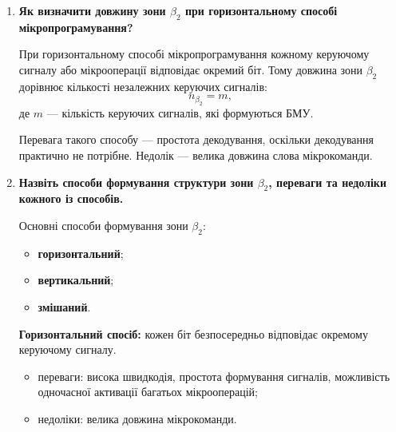 \documentclass[12pt,a4paper]{article}
\begin{document}
\begin{enumerate}
        Слово мікрокоманди зазвичай поділяється на кілька функціональних зон:
        \begin{itemize}
            \item \textbf{$\beta_1$} --- адресна зона; визначає спосіб переходу до наступної мікрокоманди, містить адресну інформацію або приріст адреси;
            \item \textbf{$\beta_2$} --- зона керуючих сигналів; задає мікрооперації, які необхідно виконати в поточній мікрокоманді;
            \item \textbf{$\beta_3$} --- зона часової організації; визначає тривалість мікрокоманди або затримку для виконання мікрооперацій;
            \item \textbf{$\beta_4$} --- додаткова або службова зона; використовується для формування спеціальних ознак, перевірок, режимів чи інших допоміжних функцій.
        \end{itemize}

        Загалом формат слова мікрокоманди можна подати як
        \[
            \text{МК} = \beta_1 \, \beta_2 \, \beta_3 \, \beta_4.
        \]

        \item \textbf{Як визначити довжину зони $\beta_2$ при горизонтальному способі мікропрограмування?}

        При горизонтальному способі мікропрограмування кожному керуючому сигналу або мікрооперації відповідає окремий біт. Тому довжина зони $\beta_2$ дорівнює кількості незалежних керуючих сигналів:
        \[
            n_{\beta_2} = m,
        \]
        де $m$ --- кількість керуючих сигналів, які формуються БМУ.

        Перевага такого способу --- простота декодування, оскільки декодування практично не потрібне. Недолік --- велика довжина слова мікрокоманди.

        \item \textbf{Назвіть способи формування структури зони $\beta_2$, переваги та недоліки кожного із способів.}

        Основні способи формування зони $\beta_2$:
        \begin{itemize}
            \item \textbf{горизонтальний};
            \item \textbf{вертикальний};
            \item \textbf{змішаний}.
        \end{itemize}

        \textbf{Горизонтальний спосіб:}
        кожен біт безпосередньо відповідає окремому керуючому сигналу.
        \begin{itemize}
            \item переваги: висока швидкодія, простота формування сигналів, можливість одночасної активації багатьох мікрооперацій;
            \item недоліки: велика довжина мікрокоманди.
        \end{itemize}


\end{enumerate}
\end{document}
